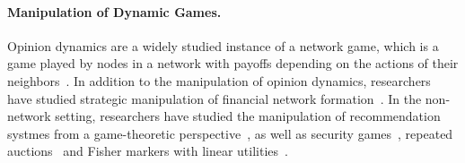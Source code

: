 
\paragraph{Manipulation of Dynamic Games.} Opinion dynamics are a widely studied instance of a network game, which is a game played by nodes in a network with payoffs depending on the actions of their neighbors~\cite{kearns2001graphical, tardos-2004}. In addition to the manipulation of opinion dynamics, researchers have studied strategic manipulation of financial network formation~\cite{jalan-chakrabarti-2024}. In the non-network setting, researchers have studied the manipulation of recommendation systmes from a game-theoretic perspective~\cite{ben2018game}, as well as security games~\cite{nguyen2019deception}, repeated auctions~\cite{kolumbus2022auctions} and Fisher markers with linear utilities~\cite{kolumbus2023asynchronous}. 



